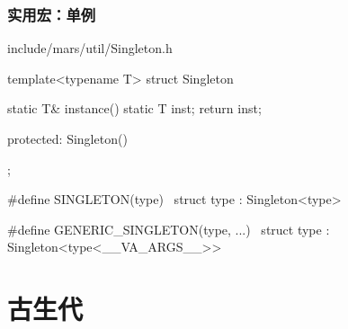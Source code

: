 \begin{content}
\subsubsection{实用宏：单例}

\begin{nodiff}{include/mars/util/Singleton.h}
 \begin{c++}
template<typename T>
struct Singleton {
  static T& instance() {
    static T inst;
    return inst;
  }

protected:
  Singleton() {}
};

#define SINGLETON(type) \
  struct type : Singleton<type>

#define GENERIC_SINGLETON(type, ...) \
  struct type : Singleton<type<__VA_ARGS__>>
 \end{c++}
\end{nodiff}

\end{content}

\section{古生代}

